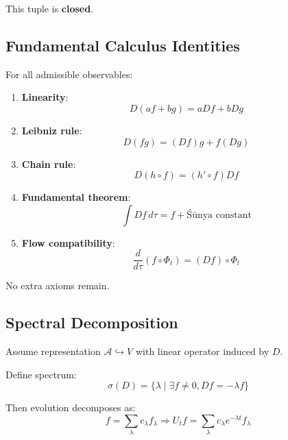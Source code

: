 \documentclass[12pt, oneside]{article}
\begin{document}
This tuple is \textbf{closed}.

\subsection{Fundamental Calculus Identities}

For all admissible observables:

\begin{enumerate}
    \item \textbf{Linearity}:
    \begin{equation}
    D(af + bg) = aDf + bDg
    \end{equation}
    
    \item \textbf{Leibniz rule}:
    \begin{equation}
    D(fg) = (Df)g + f(Dg)
    \end{equation}
    
    \item \textbf{Chain rule}:
    \begin{equation}
    D(h \circ f) = (h' \circ f)Df
    \end{equation}
    
    \item \textbf{Fundamental theorem}:
    \begin{equation}
    \int Df \, d\tau = f + \text{Śūnya constant}
    \end{equation}
    
    \item \textbf{Flow compatibility}:
    \begin{equation}
    \frac{d}{d\tau}(f \circ \Phi_t) = (Df) \circ \Phi_t
    \end{equation}
\end{enumerate}

No extra axioms remain.

\subsection{Spectral Decomposition}

Assume representation $\mathcal{A} \hookrightarrow V$ with linear operator induced by $D$.

Define spectrum:
\begin{equation}
\sigma(D) = \{\lambda \mid \exists f \neq 0, Df = -\lambda f\}
\end{equation}

Then evolution decomposes as:
\begin{equation}
f = \sum_{\lambda} c_\lambda f_\lambda \Rightarrow U_t f = \sum_{\lambda} c_\lambda e^{-\lambda t} f_\lambda
\end{equation}
\end{document}
